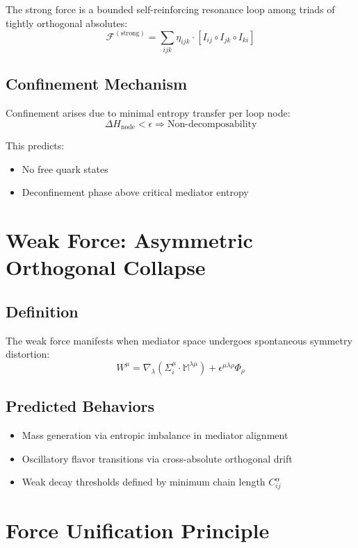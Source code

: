 \documentclass[11pt]{article}
\begin{document}
The strong force is a bounded self-reinforcing resonance loop among triads of tightly orthogonal absolutes:
\[
\mathscr{F}^{(\text{strong})} = \sum_{ijk} \eta_{ijk} \cdot \left[ I_{ij} \circ I_{jk} \circ I_{ki} \right]
\]

\subsection{Confinement Mechanism}

Confinement arises due to minimal entropy transfer per loop node:
\[
\Delta H_{\text{node}} < \epsilon \Rightarrow \text{Non-decomposability}
\]

This predicts:
\begin{itemize}[noitemsep]
    \item No free quark states
    \item Deconfinement phase above critical mediator entropy
\end{itemize}

\section{Weak Force: Asymmetric Orthogonal Collapse}

\subsection{Definition}

The weak force manifests when mediator space undergoes spontaneous symmetry distortion:
\[
W^{\mu} = \nabla_\lambda \left( \Sigma_i^\mu \cdot \mathbb{M}^{\lambda\mu} \right) + \epsilon^{\mu\lambda\rho} \Phi_\rho
\]

\subsection{Predicted Behaviors}

\begin{itemize}[noitemsep]
    \item Mass generation via entropic imbalance in mediator alignment
    \item Oscillatory flavor transitions via cross-absolute orthogonal drift
    \item Weak decay thresholds defined by minimum chain length \(C^\alpha_{ij}\)
\end{itemize}

\section{Force Unification Principle}
\end{document}
